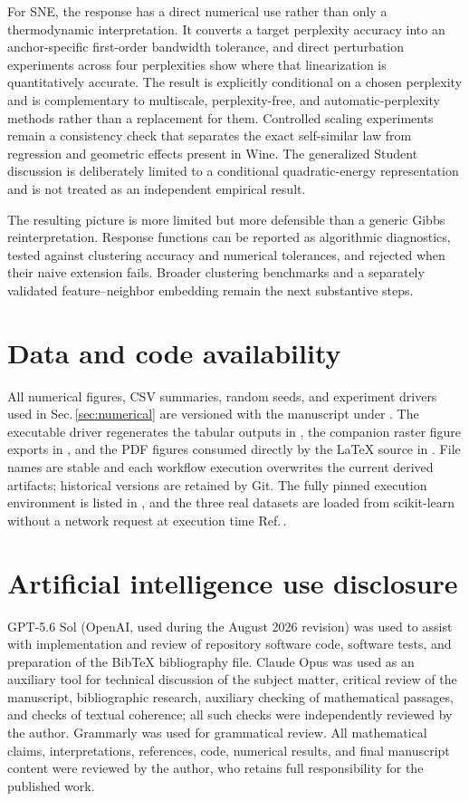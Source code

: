\documentclass[11pt,a4paper]{article}
\theoremstyle{definition}
\theoremstyle{plain}
\begin{document}
For SNE, the response has a direct numerical use rather than only a thermodynamic interpretation. It converts a target perplexity accuracy into an anchor-specific first-order bandwidth tolerance, and direct perturbation experiments across four perplexities show where that linearization is quantitatively accurate. The result is explicitly conditional on a chosen perplexity and is complementary to multiscale, perplexity-free, and automatic-perplexity methods rather than a replacement for them. Controlled scaling experiments remain a consistency check that separates the exact self-similar law from regression and geometric effects present in Wine. The generalized Student discussion is deliberately limited to a conditional quadratic-energy representation and is not treated as an independent empirical result.

The resulting picture is more limited but more defensible than a generic Gibbs reinterpretation. Response functions can be reported as algorithmic diagnostics, tested against clustering accuracy and numerical tolerances, and rejected when their naive extension fails. Broader clustering benchmarks and a separately validated feature--neighbor embedding remain the next substantive steps.

\section*{Data and code availability}
All numerical figures, CSV summaries, random seeds, and experiment drivers used in Sec.\,\ref{sec:numerical} are versioned with the manuscript under . The executable driver  regenerates the tabular outputs in , the companion raster figure exports in , and the PDF figures consumed directly by the LaTeX source in . File names are stable and each workflow execution overwrites the current derived artifacts; historical versions are retained by Git. The fully pinned execution environment is listed in , and the three real datasets are loaded from scikit-learn without a network request at execution time Ref.\,\cite{pedregosa2011scikit}.

\section*{Artificial intelligence use disclosure}
GPT-5.6 Sol (OpenAI, used during the August 2026 revision) was used to assist with implementation and review of repository software code, software tests, and preparation of the BibTeX bibliography file. Claude Opus was used as an auxiliary tool for technical discussion of the subject matter, critical review of the manuscript, bibliographic research, auxiliary checking of mathematical passages, and checks of textual coherence; all such checks were independently reviewed by the author. Grammarly was used for grammatical review. All mathematical claims, interpretations, references, code, numerical results, and final manuscript content were reviewed by the author, who retains full responsibility for the published work.


\printbibliography
\end{document}
